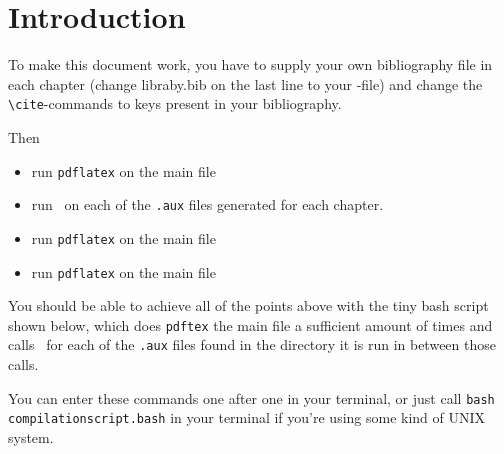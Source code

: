 \chapter{Introduction}
To make this document work, you have to supply your own bibliography file in
each chapter (change {libraby.bib} on the last line to your \BibTeX-file) and
change the \verb+\cite+-commands to keys present in your bibliography.

Then 
\begin{itemize}
\item run \verb+pdflatex+ on the main file
\item run \BibTeX\ on each of the \verb+.aux+ files generated for each chapter.
\item run \verb+pdflatex+ on the main file
\item run \verb+pdflatex+ on the main file
\end{itemize}

You should be able to achieve all of the points above with the tiny bash script
shown below, which does \verb+pdftex+ the main file a sufficient amount of times
and calls \BibTeX\ for each of the \verb+.aux+ files found in the directory it
is run in between those calls.



You can enter these commands one after one in your terminal, or just call
\verb+bash compilationscript.bash+ in your terminal if you're using some kind of
UNIX system.

\cite{Author2013}


